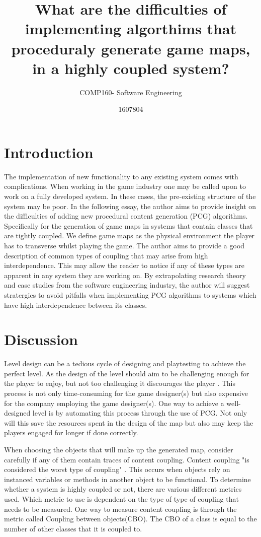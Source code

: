 \documentclass{scrartcl}
\title{What are the difficulties of implementing algorthims that proceduraly generate game maps, in a highly coupled system?}
\subtitle{COMP160- Software Engineering}
\author{1607804}
\begin{document}
\maketitle


\section{Introduction}
The implementation of new functionality to any existing system comes with complications. When working in the game industry one may be called upon to work on a fully developed system. In these cases, the pre-existing structure of the system may be poor. In the following essay, the author aims to provide insight on the difficulties of adding new procedural content generation (PCG) algorithms. Specifically for the generation of game maps in systems that contain classes that are tightly coupled. We define game maps as the physical environment the player has to transverse whilst playing the game. The author aims to provide a good description of common types of coupling that may arise from high interdependence. This may allow the reader to notice if any of these types are apparent in any system they are working on. By extrapolating research theory and case studies from the software engineering industry, the author will suggest stratergies to avoid pitfalls when implementing PCG algorithms to systems which have high interdependence between its classes. 

\section{Discussion}
 Level design can be a tedious cycle of designing and playtesting to achieve the perfect level. As the design of the level should aim to be challenging enough for the player to enjoy, but not too challenging it discourages the player \cite {kayali2011retro}. This process is not only time-consuming for the game designer(s) but also expensive for the company employing the game designer(s). One way to achieve a well-designed level is by automating this process through the use of PCG. Not only will this save the resources spent in the design of the map but also may keep the players engaged for longer if done correctly.

When choosing the objects that will make up the generated map, consider carefully if any of them contain traces of content coupling. Content coupling "is considered the worst type of coupling" \cite[p. 95]{briand1999unified}. This occurs when objects rely on instanced variables or methods in another object to be functional.  To determine whether a system is highly coupled or not, there are various different metrics used. Which metric to use is dependent on the type of type of coupling that needs to be measured. One way to measure content coupling is through the metric called Coupling between objects(CBO)\cite {chidamber1994metrics}. The CBO of a class is equal to the number of other classes that it is coupled to.
\end{document}
